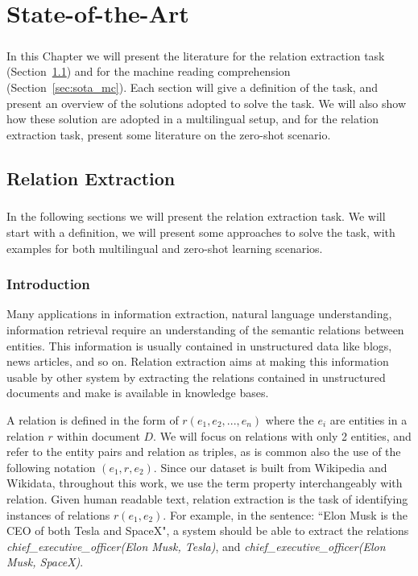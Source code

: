 \chapter{State-of-the-Art} %
\label{chpt:3}
\paragraph{}
In this Chapter we will present the literature for the relation extraction task (Section~\ref{sec:sota_re}) and for the machine reading comprehension (Section~\ref{sec:sota_mc}). Each section will give a definition of the task, and present an overview of the solutions adopted to solve the task. We will also show how these solution are adopted in a multilingual setup, and for the relation extraction task, present some literature on the zero-shot scenario.   


\section{Relation Extraction}
\label{sec:sota_re}
\paragraph{}
In the following sections we will present the relation extraction task. We will start with a definition, we will present some approaches to solve the task, with examples for both multilingual and zero-shot learning scenarios.

\subsection{Introduction}
Many applications in information extraction, natural language understanding, information retrieval require an understanding of the semantic relations between entities. This information is usually contained in unstructured data like blogs, news articles, and so on.  Relation extraction aims at making this information usable by other system by extracting the relations contained in unstructured documents and make is available in knowledge bases.

A relation is defined in the form of $r(e_1, e_2, ..., e_n)$ where the $e_i$ are entities in a relation $r$ within document $D$. We will focus on relations with only 2 entities, and refer to the entity pairs and relation as triples, as is common also the use of the following notation $(e_1, r, e_2)$. Since our dataset is built from Wikipedia and Wikidata, throughout this work, we use the term property interchangeably with relation. Given human readable text, relation extraction is the task of identifying instances of relations $r(e_1,e_2)$. For example, in the sentence: ``Elon Musk is the CEO of both Tesla and SpaceX", a system should be able to extract the relations \textit{chief\_executive\_officer({Elon Musk}, Tesla)}, and \textit{chief\_executive\_officer(Elon Musk, SpaceX)}. 


